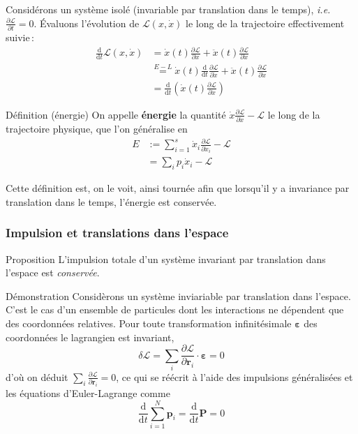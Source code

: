         Considérons un système isolé (invariable par translation dans le temps), \textit{i.e.} $\frac{\partial \mathcal{L}}{\partial t} = 0$. Évaluons l’évolution de $\mathcal{L}(x,\dot{x})$ le long de la trajectoire effectivement suivie :
        \begin{align*}
            \frac{\text{d}}{\text{d}t}\mathcal{L}(x, \dot{x}) 
            &= \dot{x}(t) \frac{\partial \mathcal{L}}{\partial x} + \ddot{x}(t) \frac{\partial \mathcal{L}}{\partial \dot{x}} \\
            &\overset{E-L}{=} \dot{x}(t) \frac{\text{d}}{\text{d}t} \frac{\partial \mathcal{L}}{\partial \dot{x}}  + \ddot{x}(t) \frac{\partial \mathcal{L}}{\partial \dot{x}} \\
            &= \frac{\text{d}}{\text{d}t} \left(\dot{x}(t) \frac{\partial \mathcal{L}}{\partial \dot{x}} \right)
        \end{align*}
        
        \begin{omed}{Définition (énergie)}
            On appelle \textbf{énergie} la quantité $\dot{x} \frac{\partial \mathcal{L}}{\partial \dot{x}} - \mathcal{L}$ le long de la trajectoire physique, que l’on généralise en
            \begin{align*}
                E &:= \sum_{i=1}^s \dot{x}_i \frac{\partial \mathcal{L}}{\partial \dot{x}_i} - \mathcal{L} \\
                &= \sum_{i} p_i \dot{x}_i - \mathcal{L}
            \end{align*}
        \end{omed}

        Cette définition est, on le voit, ainsi tournée afin que lorsqu’il y a invariance par translation dans le temps, l’énergie est conservée.

        \subsubsection{Impulsion et translations dans l’espace}

        \begin{omed}{Proposition}
            L’impulsion totale d’un système invariant par translation dans l’espace est \textit{conservée}.
        \end{omed}

        \begin{demo}{Démonstration}
            Considèrons un système inviariable par translation dans l’espace. C’est le cas d’un ensemble de particules dont les interactions ne dépendent que des coordonnées relatives. Pour toute transformation infinitésimale $\symbf{\varepsilon}$ des coordonnées le lagrangien est invariant,
            \[ \delta \mathcal{L} = \sum_{i} \frac{\partial \mathcal{L}}{\partial \mathbf{r}_i} \cdot \symbf{\varepsilon} = 0 \]   
            d’où on déduit $\sum_{i} \frac{\partial \mathcal{L}}{\partial \mathbf{r}_i} = 0$, ce qui se réécrit à l’aide des impulsions généralisées et les équations d’Euler-Lagrange comme 
            \[ \frac{\text{d}}{\text{d}t}  \sum_{i = 1}^N \mathbf{p}_i = \frac{\text{d}}{\text{d}t} \mathbf{P} = 0 \]   
        \end{demo}


